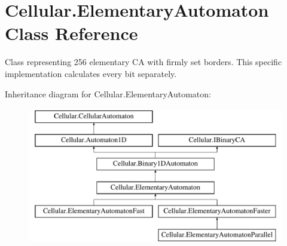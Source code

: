 \hypertarget{class_cellular_1_1_elementary_automaton}{}\section{Cellular.\+Elementary\+Automaton Class Reference}
\label{class_cellular_1_1_elementary_automaton}


Class representing 256 elementary C\+A with firmly set borders. This specific implementation calculates every bit separately.  


Inheritance diagram for Cellular.\+Elementary\+Automaton\+:\begin{figure}[H]
\begin{center}
\leavevmode
\includegraphics[height=6.000000cm]{class_cellular_1_1_elementary_automaton}
\end{center}
\end{figure}
